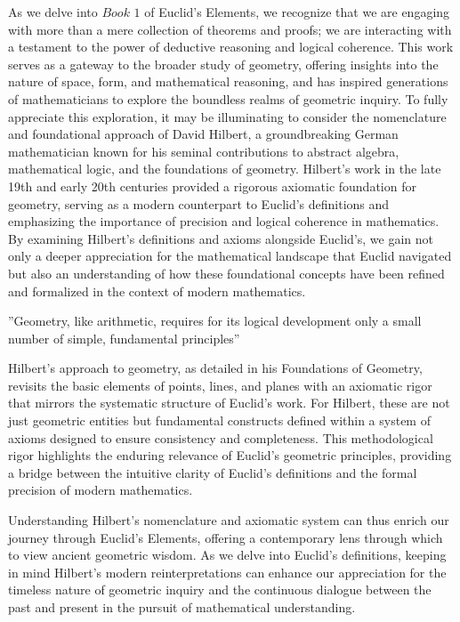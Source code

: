 As we delve into $\textit{Book 1}$ of Euclid's Elements, we recognize that we are engaging with more than a mere collection of theorems and proofs; we are interacting with a testament to the power of deductive reasoning and logical coherence. This work serves as a gateway to the broader study of geometry, offering insights into the nature of space, form, and mathematical reasoning, and has inspired generations of mathematicians to explore the boundless realms of geometric inquiry. To fully appreciate this exploration, it may be illuminating to consider the nomenclature and foundational approach of David Hilbert, a groundbreaking German mathematician known for his seminal contributions to abstract algebra, mathematical logic, and the foundations of geometry. Hilbert's work in the late 19th and early 20th centuries provided a rigorous axiomatic foundation for geometry, serving as a modern counterpart to Euclid's definitions and emphasizing the importance of precision and logical coherence in mathematics. By examining Hilbert's definitions and axioms alongside Euclid's, we gain not only a deeper appreciation for the mathematical landscape that Euclid navigated but also an understanding of how these foundational concepts have been refined and formalized in the context of modern mathematics.

''Geometry, like arithmetic, requires for its logical development only a small number of simple, fundamental principles''

Hilbert's approach to geometry, as detailed in his Foundations of Geometry, revisits the basic elements of points, lines, and planes with an axiomatic rigor that mirrors the systematic structure of Euclid's work. For Hilbert, these are not just geometric entities but fundamental constructs defined within a system of axioms designed to ensure consistency and completeness. This methodological rigor highlights the enduring relevance of Euclid's geometric principles, providing a bridge between the intuitive clarity of Euclid's definitions and the formal precision of modern mathematics.

Understanding Hilbert's nomenclature and axiomatic system can thus enrich our journey through Euclid's Elements, offering a contemporary lens through which to view ancient geometric wisdom. As we delve into Euclid's definitions, keeping in mind Hilbert's modern reinterpretations can enhance our appreciation for the timeless nature of geometric inquiry and the continuous dialogue between the past and present in the pursuit of mathematical understanding.

